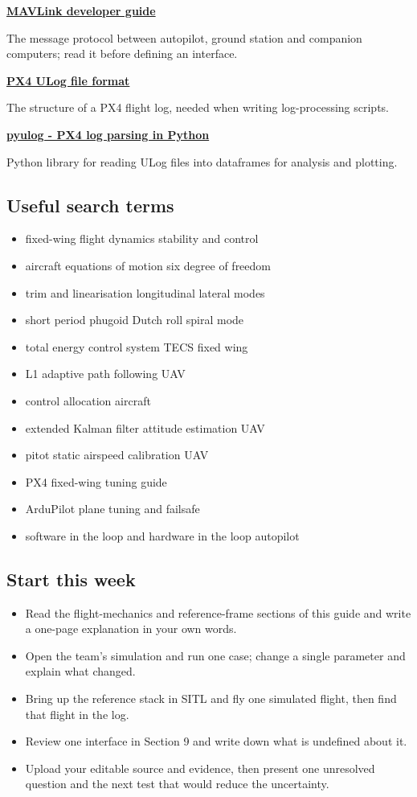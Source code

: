 \documentclass[11pt,a4paper]{article}
\newcommand{\Resource}[3]{%
  \begin{resourcebox}
    \href{#2}{\textbf{\color{DARESTeal}#1}}\par
    {\small #3}
  \end{resourcebox}
}
\begin{document}
\Resource
  {MAVLink developer guide}
  {https://mavlink.io/en/}
  {The message protocol between autopilot, ground station and companion computers; read it before defining an interface.}

\Resource
  {PX4 ULog file format}
  {https://docs.px4.io/main/en/dev_log/ulog_file_format.html}
  {The structure of a PX4 flight log, needed when writing log-processing scripts.}

\Resource
  {pyulog - PX4 log parsing in Python}
  {https://github.com/PX4/pyulog}
  {Python library for reading ULog files into dataframes for analysis and plotting.}

\subsection{Useful search terms}
\begin{itemize}
  \item fixed-wing flight dynamics stability and control
  \item aircraft equations of motion six degree of freedom
  \item trim and linearisation longitudinal lateral modes
  \item short period phugoid Dutch roll spiral mode
  \item total energy control system TECS fixed wing
  \item L1 adaptive path following UAV
  \item control allocation aircraft
  \item extended Kalman filter attitude estimation UAV
  \item pitot static airspeed calibration UAV
  \item PX4 fixed-wing tuning guide
  \item ArduPilot plane tuning and failsafe
  \item software in the loop and hardware in the loop autopilot
\end{itemize}

\subsection{Start this week}
\begin{itemize}
  \item Read the flight-mechanics and reference-frame sections of this guide and write a one-page explanation in your own words.
  \item Open the team's simulation and run one case; change a single parameter and explain what changed.
  \item Bring up the reference stack in SITL and fly one simulated flight, then find that flight in the log.
  \item Review one interface in Section 9 and write down what is undefined about it.
  \item Upload your editable source and evidence, then present one unresolved question and the next test that would reduce the uncertainty.
\end{itemize}
\end{document}
